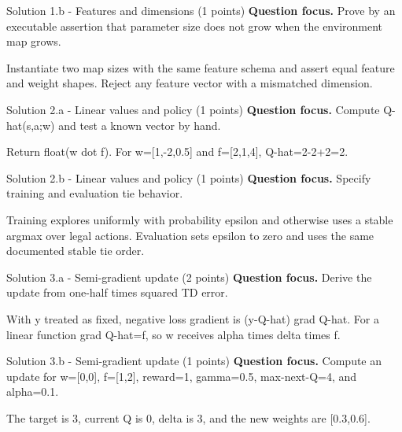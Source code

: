 \documentclass[aspectratio=169,11pt]{beamer}
\begin{document}
\begin{frame}{Solution 1.b - Features and dimensions (1 points)}
\small
\textbf{Question focus.} Prove by an executable assertion that parameter size does not grow when the environment map grows.

\vspace{0.25cm}
\answerlabel Instantiate two map sizes with the same feature schema and assert equal feature and weight shapes. Reject any feature vector with a mismatched dimension.
\end{frame}

\begin{frame}{Solution 2.a - Linear values and policy (1 points)}
\small
\textbf{Question focus.} Compute Q-hat(s,a;w) and test a known vector by hand.

\vspace{0.25cm}
\answerlabel Return float(w dot f). For w=[1,-2,0.5] and f=[2,1,4], Q-hat=2-2+2=2.
\end{frame}

\begin{frame}{Solution 2.b - Linear values and policy (1 points)}
\small
\textbf{Question focus.} Specify training and evaluation tie behavior.

\vspace{0.25cm}
\answerlabel Training explores uniformly with probability epsilon and otherwise uses a stable argmax over legal actions. Evaluation sets epsilon to zero and uses the same documented stable tie order.
\end{frame}

\begin{frame}{Solution 3.a - Semi-gradient update (2 points)}
\small
\textbf{Question focus.} Derive the update from one-half times squared TD error.

\vspace{0.25cm}
\answerlabel With y treated as fixed, negative loss gradient is (y-Q-hat) grad Q-hat. For a linear function grad Q-hat=f, so w receives alpha times delta times f.
\end{frame}

\begin{frame}{Solution 3.b - Semi-gradient update (1 points)}
\small
\textbf{Question focus.} Compute an update for w=[0,0], f=[1,2], reward=1, gamma=0.5, max-next-Q=4, and alpha=0.1.

\vspace{0.25cm}
\answerlabel The target is 3, current Q is 0, delta is 3, and the new weights are [0.3,0.6].
\end{frame}
\end{document}
